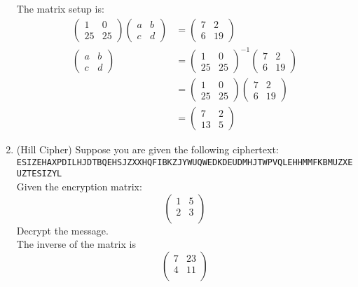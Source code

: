 \documentclass[12pt]{amsart}
\theoremstyle{plain}
\theoremstyle{definition}
\begin{document}
\begin{enumerate}[1.]
	The matrix setup is:
	\begin{align*}
	\left(\begin{array}{cc}
	1 & 0\\
	25 & 25
	\end{array}\right)
	\left(\begin{array}{cc}
	a & b\\
	c & d
	\end{array}\right) &=
	\left(\begin{array}{cc}
	7 & 2\\
	6 & 19
	\end{array}\right)\\
	\left(\begin{array}{cc}
	a & b\\
	c & d
	\end{array}\right) &=
	\left(\begin{array}{cc}
	1 & 0\\
	25 & 25
	\end{array}\right)^{-1}
	\left(\begin{array}{cc}
	7 & 2\\
	6 & 19
	\end{array}\right)\\
	&= \left(\begin{array}{cc}
	1 & 0\\
	25 & 25
	\end{array}\right)
	\left(\begin{array}{cc}
	7 & 2\\
	6 & 19
	\end{array}\right)\\
	&= \left(\begin{array}{cc}
	7 & 2\\
	13 & 5
	\end{array}\right)
	\end{align*}
	
	\item (Hill Cipher) Suppose you are given the following ciphertext:\\
	\texttt{ESIZEHAXPDILHJDTBQEHSJZXXHQFIBKZJYWUQWEDKDEUDMHJTWPVQLEHHMMFKBMUZXEUZTESIZYL}\\
	Given the encryption matrix:
	$$\left(\begin{array}{rr}
	1 & 5\\
	2 & 3\\
	\end{array}\right)$$
	Decrypt the message.\\

	The inverse of the matrix is$$\left(\begin{array}{rr}
	7 & 23\\
	4 & 11\\
	\end{array}\right)$$
	

\end{enumerate}
\end{document}
